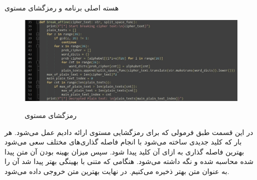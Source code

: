 \SubProblem
{هسته اصلی برنامه و رمزگشای مستوی}
{
\begin{figure}[H]
    \centering
    \includegraphics[width=15cm]{Images/F4.jpg}
    \label{fig:label}
    \caption{رمزگشای مستوی}
\end{figure}

در این قسمت طبق فرمولی که برای رمزگشایی مستوی ارائه دادیم عمل می‌شود.
هر بار که کلید جدیدی ساخته می‌شود با انجام فاصله گذاری‌های مختلف سعی می‌شود بهترین فاصله گذاری به ازای آن کلید پیدا شود. سپس میزان بهینه بودن آن متن پیدا شده محاسبه شده و نگه داشته می‌شود. هنگامی که متنی با بهینگی بهتر پیدا شد آن را به عنوان متن بهتر ذخیره می‌کنیم.
در نهایت بهترین متن خروجی داده می‌شود.
}
